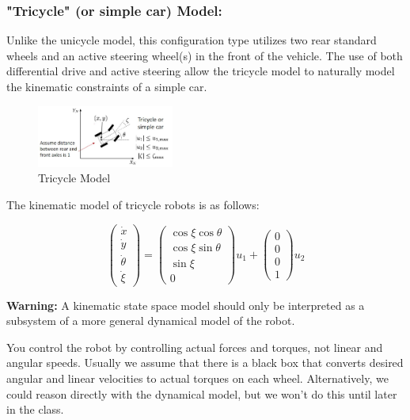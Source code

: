 \documentclass[twoside]{article}
\begin{document}
\subsubsection*{"Tricycle" (or simple car) Model:}

Unlike the unicycle model, this configuration type utilizes two rear standard wheels and an active steering wheel(s) in the front of the vehicle. The use of both differential drive and active steering allow the tricycle model to naturally model the kinematic constraints of a simple car\cite{sns}.

\begin{figure}[H]
\centering
\includegraphics[width=0.4\textwidth]{tricycle}
\caption{Tricycle Model}
\end{figure}

The kinematic model of tricycle robots is as follows:

\[ \begin{pmatrix}
\dot{x} \\ \dot{y} \\ \dot{\theta} \\ \dot{\xi}
\end{pmatrix} =
\begin{pmatrix} \cos \xi \cos \theta \\ \cos \xi \sin \theta \\ \sin \xi \\ 0 \end{pmatrix} u_1 + \begin{pmatrix} 0 \\ 0 \\ 0 \\ 1 \end{pmatrix} u_2
\]

\textbf{Warning:} A kinematic state space model should only be interpreted as a subsystem of a more general dynamical model of the robot.

You control the robot by controlling actual forces and torques, not linear and angular speeds. Usually we assume that there is a black box that converts desired angular and linear velocities to actual torques on each wheel. Alternatively, we could reason directly with the dynamical model, but we won't do this until later in the class.
\end{document}
